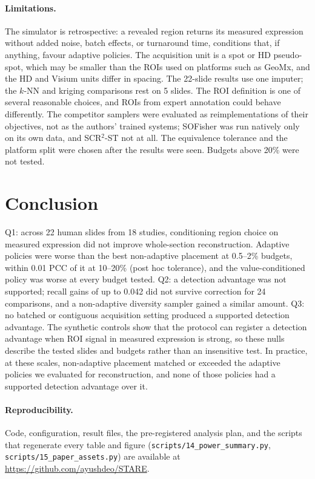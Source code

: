 \documentclass{article}
\begin{document}
\paragraph{Limitations.}
The simulator is retrospective: a revealed region returns its measured expression without added noise, batch
effects, or turnaround time, conditions that, if anything, favour adaptive policies. The acquisition unit is a
spot or HD pseudo-spot, which may be smaller than the ROIs used on platforms such as GeoMx, and the HD and
Visium units differ in spacing.
The 22-slide results use one imputer; the $k$-NN and kriging comparisons rest on 5 slides. The ROI definition is
one of several reasonable choices, and ROIs from expert annotation could behave differently. The competitor
samplers were evaluated as reimplementations of their objectives, not as the authors' trained systems; SOFisher
was run natively only on its own data, and SCR$^2$-ST not at all. The equivalence tolerance and the platform
split were chosen after the results were seen. Budgets above 20\% were not tested.

\section{Conclusion}

Q1: across 22 human slides from 18 studies, conditioning region choice on measured expression did not improve
whole-section reconstruction. Adaptive policies were worse than the best non-adaptive placement at 0.5--2\%
budgets, within 0.01 PCC of it at 10--20\% (post hoc tolerance), and the value-conditioned policy was worse at
every budget tested. Q2: a detection advantage was not supported; recall gains of up to 0.042 did not survive
correction for 24 comparisons, and a non-adaptive diversity sampler gained a similar amount. Q3: no batched or
contiguous acquisition setting produced a supported detection advantage. The synthetic controls show that the
protocol can register a detection advantage when ROI signal in measured expression is strong, so these nulls
describe the tested slides and budgets rather than an insensitive test. In practice, at these scales,
non-adaptive placement matched or exceeded the adaptive policies we evaluated for reconstruction, and none of
those policies had a supported detection advantage over it.

\paragraph{Reproducibility.}
Code, configuration, result files, the pre-registered analysis plan, and the scripts that regenerate every
table and figure (\texttt{scripts/14\_power\_summary.py}, \texttt{scripts/15\_paper\_assets.py}) are available at
\url{https://github.com/ayushdeo/STARE}.
\end{document}
